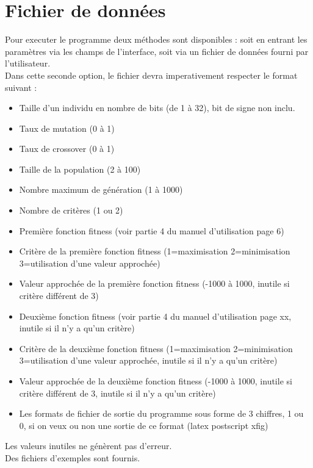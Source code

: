 \documentclass[a4paper,11pt]{article}
\begin{document}
\section{Fichier de données}
Pour executer le programme deux méthodes sont disponibles : soit en entrant les paramètres via les champs de l'interface, soit via un fichier de données fourni par l'utilisateur.\\
Dans cette seconde option, le fichier devra imperativement respecter le format suivant : \\
\begin{itemize}
 \item Taille d'un individu en nombre de bits (de 1 à 32), bit de signe non inclu.
 \item Taux de mutation (0 à 1)
 \item Taux de crossover (0 à 1)
 \item Taille de la population (2 à 100)
 \item Nombre maximum de génération (1 à 1000)
 \item Nombre de critères (1 ou 2)
 \item Première fonction fitness (voir partie 4 du manuel d'utilisation page 6)
 \item Critère de la première fonction fitness (1=maximisation 2=minimisation 3=utilisation d'une valeur approchée)
 \item Valeur approchée de la première fonction fitness (-1000 à 1000, inutile si critère différent de 3)
 \item Deuxième fonction fitness (voir partie 4 du manuel d'utilisation page xx, inutile si il n'y a qu'un critère)
 \item Critère de la deuxième fonction fitness (1=maximisation 2=minimisation 3=utilisation d'une valeur approchée, inutile si il n'y a qu'un critère)
 \item Valeur approchée de la deuxième fonction fitness (-1000 à 1000, inutile si critère différent de 3, inutile si il n'y a qu'un critère)
 \item Les formats de fichier de sortie du programme sous forme de 3 chiffres, 1 ou 0, si on veux ou non une sortie de ce format (latex postscript xfig)
 \end{itemize}
 Les valeurs inutiles ne génèrent pas d'erreur.\\
 Des fichiers d'exemples sont fournis.\\

\newpage
\end{document}
